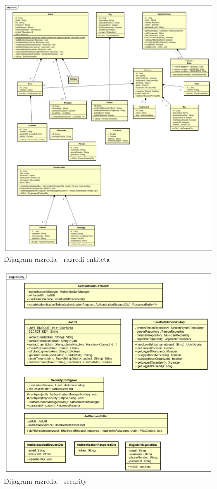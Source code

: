 		\begin{figure}[H]
			\begin{center}
				\includegraphics[width=17cm]{slike/domena.PNG}
			\end{center}
			\caption{Dijagram razreda - razredi entiteta}
			\label{fig:domena}
		\end{figure}
	
		\begin{figure}[H]
			\begin{center}
				\includegraphics[width=17cm]{slike/security.PNG}
			\end{center}
			\caption{Dijagram razreda - security}
			\label{fig:sec}
		\end{figure}
		
